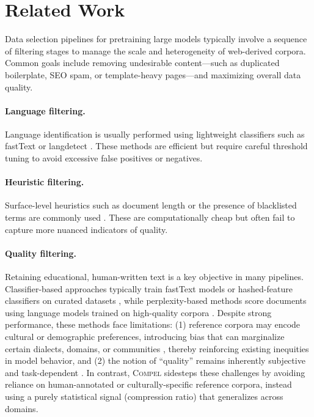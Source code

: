 \section{Related Work}\label{sec:related}

Data selection pipelines for pretraining large models typically involve a sequence of filtering stages to manage the scale and heterogeneity of web-derived corpora.
Common goals include removing undesirable content---such as duplicated boilerplate, SEO spam, or template-heavy pages---and maximizing overall data quality.

\paragraph{Language filtering.}
Language identification is usually performed using lightweight classifiers such as fastText or langdetect \citep{raffel2020exploring, soldaini2024dolma, conneau2019cross, xue2021mt5, laurencon2022roots, grave2018learning}.
These methods are efficient but require careful threshold tuning to avoid excessive false positives or negatives.

\paragraph{Heuristic filtering.}
Surface-level heuristics such as document length or the presence of blacklisted terms are commonly used \citep{rae2021scaling, raffel2020exploring, aghajanyan2022htlm}.
These are computationally cheap but often fail to capture more nuanced indicators of quality.

\paragraph{Quality filtering.}
Retaining educational, human-written text is a key objective in many pipelines.
Classifier-based approaches typically train fastText models or hashed-feature classifiers on curated datasets \citep{du2022glam, longpre2023flan}, while perplexity-based methods score documents using language models trained on high-quality corpora \citep{wenzek2020ccnet, wettig2024qurating}.
Despite strong performance, these methods face limitations: (1) reference corpora may encode cultural or demographic preferences, introducing bias that can marginalize certain dialects, domains, or communities \citep{gururangan2022whose, xu2021detoxifying}, thereby reinforcing existing inequities in model behavior, and (2) the notion of ``quality'' remains inherently subjective and task-dependent \citep{longpre2023flan}.
In contrast, \textsc{Compel} sidesteps these challenges by avoiding reliance on human-annotated or culturally-specific reference corpora, instead using a purely statistical signal (compression ratio) that generalizes across domains.

